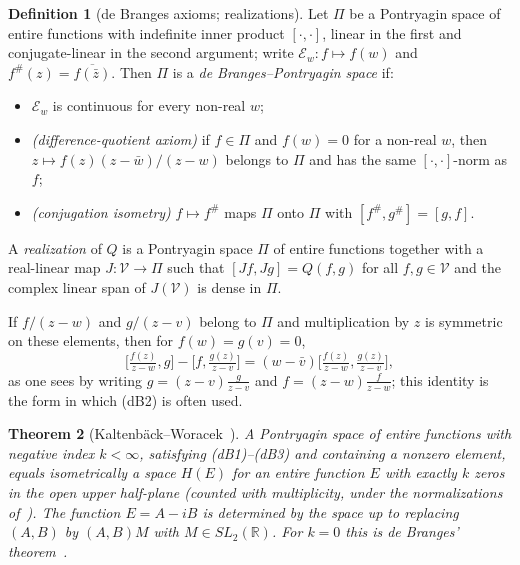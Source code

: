 \documentclass[11pt]{amsart}
\newtheorem{theorem}{Theorem}[section]
\theoremstyle{definition}
\newtheorem{definition}[theorem]{Definition}
\theoremstyle{remark}
\begin{document}
\begin{definition}[de Branges axioms; realizations]\label{def:axioms}
Let $\Pi$ be a Pontryagin space of entire functions with indefinite inner product
$[\cdot,\cdot]$, linear in the first and conjugate-linear in the second argument; write
$\mathcal E_w:f\mapsto f(w)$ and $f^\#(z)=\overline{f(\bar z)}$. Then $\Pi$ is a
\emph{de Branges--Pontryagin space} if:
\begin{itemize}
\item[\textbf{(dB1)}] $\mathcal E_w$ is continuous for every non-real $w$;
\item[\textbf{(dB2)}] \emph{(difference-quotient axiom)} if $f\in\Pi$ and $f(w)=0$ for a
non-real $w$, then $z\mapsto f(z)(z-\bar w)/(z-w)$ belongs to $\Pi$ and has the same
$[\cdot,\cdot]$-norm as $f$;
\item[\textbf{(dB3)}] \emph{(conjugation isometry)} $f\mapsto f^\#$ maps $\Pi$ onto $\Pi$ with
$[f^\#,g^\#]=[g,f]$.
\end{itemize}
A \emph{realization} of $Q$ is a Pontryagin space $\Pi$ of entire functions together with a
real-linear map $J:\mathcal V\to\Pi$ such that $[Jf,Jg]=Q(f,g)$ for all $f,g\in\mathcal V$ and the
complex linear span of $J(\mathcal V)$ is dense in $\Pi$.
\end{definition}

If $f/(z-w)$ and $g/(z-v)$ belong to $\Pi$ and multiplication by $z$ is symmetric on these
elements, then for $f(w)=g(v)=0$,
\[
\Big[\tfrac{f(z)}{z-w},g\Big]-\Big[f,\tfrac{g(z)}{z-v}\Big]
=(w-\bar v)\Big[\tfrac{f(z)}{z-w},\tfrac{g(z)}{z-v}\Big],
\]
as one sees by writing $g=(z-v)\frac{g}{z-v}$ and $f=(z-w)\frac{f}{z-w}$; this identity is the
form in which (dB2) is often used.

\begin{theorem}[Kaltenb\"ack--Woracek~\cite{KW}]\label{thm:dB}
A Pontryagin space of entire functions with negative index $k<\infty$, satisfying
\textnormal{(dB1)--(dB3)} and containing a nonzero element, equals isometrically a space $H(E)$
for an entire function $E$ with exactly $k$ zeros in the open upper half-plane (counted with
multiplicity, under the normalizations of~\cite{KW}). The function $E=A-iB$ is determined by the
space up to replacing $(A,B)$ by $(A,B)M$ with $M\in SL_2(\mathbb R)$. For $k=0$ this is de
Branges' theorem~\cite{deBranges}.
\end{theorem}
\end{document}
